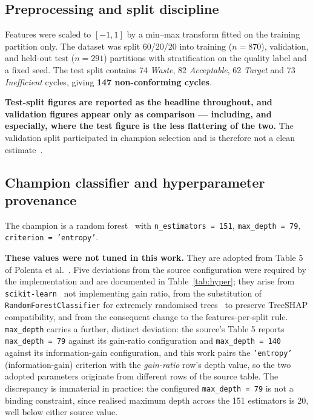 \documentclass[11pt,a4paper]{article}
\begin{document}
\subsection{Preprocessing and split discipline}

Features were scaled to $[-1, 1]$ by a min--max transform fitted on the training partition only. The dataset was split 60/20/20 into training ($n = 870$), validation, and held-out test ($n = 291$) partitions with stratification on the quality label and a fixed seed. The test split contains 74 \emph{Waste}, 82 \emph{Acceptable}, 62 \emph{Target} and 73 \emph{Inefficient} cycles, giving \textbf{147 non-conforming cycles}.

\textbf{Test-split figures are reported as the headline throughout, and validation figures appear only as comparison --- including, and especially, where the test figure is the less flattering of the two.} The validation split participated in champion selection and is therefore not a clean estimate~\cite{cawley2010}.

\subsection{Champion classifier and hyperparameter provenance}

The champion is a random forest~\cite{breiman2001} with \texttt{n\_estimators = 151}, \texttt{max\_depth = 79}, \texttt{criterion = 'entropy'}.

\textbf{These values were not tuned in this work.} They are adopted from Table 5 of Polenta et al.~\cite{polenta2022}. Five deviations from the source configuration were required by the implementation and are documented in Table~\ref{tab:hyper}; they arise from \texttt{scikit-learn}~\cite{pedregosa2011} not implementing gain ratio, from the substitution of \texttt{RandomForestClassifier} for extremely randomised trees~\cite{geurts2006} to preserve TreeSHAP compatibility, and from the consequent change to the features-per-split rule. \texttt{max\_depth} carries a further, distinct deviation: the source's Table 5 reports \texttt{max\_depth = 79} against its gain-ratio configuration and \texttt{max\_depth = 140} against its information-gain configuration, and this work pairs the \texttt{'entropy'} (information-gain) criterion with the \emph{gain-ratio} row's depth value, so the two adopted parameters originate from different rows of the source table. The discrepancy is immaterial in practice: the configured \texttt{max\_depth = 79} is not a binding constraint, since realised maximum depth across the 151 estimators is 20, well below either source value.
\end{document}
